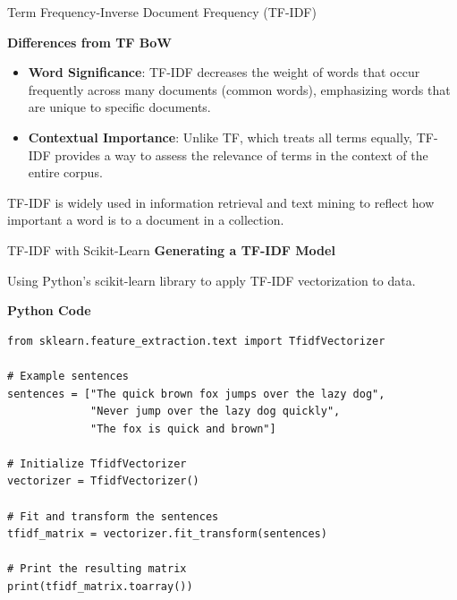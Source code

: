 \documentclass{beamer}
\newenvironment{stepitemize}{\begin{itemize}[<+->]}{\end{itemize} }
\begin{document}
\begin{frame}{Term Frequency-Inverse Document Frequency (TF-IDF)}

\textbf{Differences from TF BoW}
\begin{stepitemize}
  \item \textbf{Word Significance}: TF-IDF decreases the weight of words that occur frequently across many documents (common words), emphasizing words that are unique to specific documents.
  \item \textbf{Contextual Importance}: Unlike TF, which treats all terms equally, TF-IDF provides a way to assess the relevance of terms in the context of the entire corpus.
\end{stepitemize}
\pause
TF-IDF is widely used in information retrieval and text mining to reflect how important a word is to a document in a collection.

\end{frame}

\begin{frame}[fragile]{TF-IDF with Scikit-Learn}
\small
\textbf{Generating a TF-IDF Model}

Using Python's scikit-learn library to apply TF-IDF vectorization to data.

\textbf{Python Code}

\begin{tcolorbox}[colback=lightgray, colframe=lightgray,
                  boxsep=0mm, arc=1mm, boxrule=0mm,
                  left=1mm, right=1mm, top=1mm, bottom=1mm]
\begin{Verbatim}[fontsize=\scriptsize, bgcolor=lightgray]
from sklearn.feature_extraction.text import TfidfVectorizer

# Example sentences
sentences = ["The quick brown fox jumps over the lazy dog",
             "Never jump over the lazy dog quickly",
             "The fox is quick and brown"]

# Initialize TfidfVectorizer
vectorizer = TfidfVectorizer()

# Fit and transform the sentences
tfidf_matrix = vectorizer.fit_transform(sentences)

# Print the resulting matrix
print(tfidf_matrix.toarray())
\end{Verbatim}
\end{tcolorbox}

\end{frame}
\end{document}
